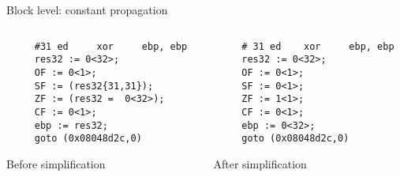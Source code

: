 \begin{frame}[fragile]{Block level: constant propagation}
     \begin{columns}[t]
     \begin{column}[T]{5.5cm}
     \lstset{basicstyle=\tiny, stepnumber=10000}
     \begin{lstlisting}
     #31 ed     xor 	ebp, ebp 
     res32 := 0<32>;
     OF := 0<1>;
     SF := (res32{31,31});
     ZF := (res32 =  0<32>);
     CF := 0<1>;
     ebp := res32;
     goto (0x08048d2c,0) 
     \end{lstlisting}
     \begin{center}
     Before simplification
     \end{center}
     \end{column}
     \begin{column}[T]{5.5cm}
     \lstset{basicstyle=\tiny, stepnumber=10000}
     \begin{lstlisting}
     # 31 ed    xor 	ebp, ebp 
     res32 := 0<32>;
     OF := 0<1>;
     SF := 0<1>;
     ZF := 1<1>;
     CF := 0<1>;
     ebp := 0<32>;
     goto (0x08048d2c,0) 
     \end{lstlisting}
     \begin{center}
     After simplification
     \end{center}
     \end{column}
     \end{columns}
\end{frame}



